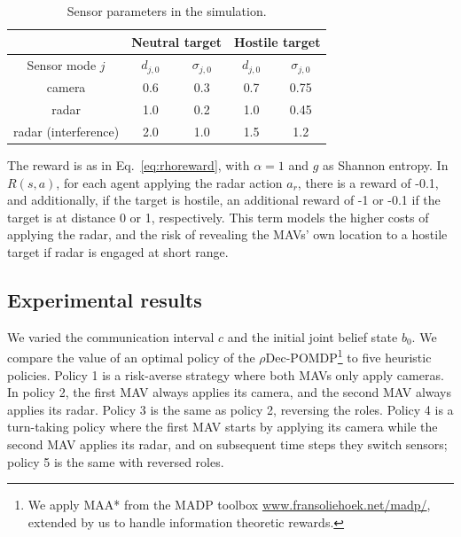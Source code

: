 \begin{table}[]
\centering
\caption{Sensor parameters in the simulation.}
\label{tab:obsmodel}
\begin{tabular}{@{}ccccc@{}}
\toprule
            & \multicolumn{2}{c}{Neutral target} & \multicolumn{2}{c}{Hostile target} \\ \midrule
Sensor mode $j$ & $d_{j,0}$      & $\sigma_{j,0}$  & $d_{j,0}$       & $\sigma_{j,0}$            \\ \midrule
camera              &   0.6      &  0.3            &   0.7           & 0.75             \\
radar               &  1.0       &  0.2            &   1.0           & 0.45             \\
radar (interference)&  2.0       &  1.0            &   1.5           & 1.2             \\ \bottomrule
\end{tabular}
\end{table}


The reward is as in Eq.~\eqref{eq:rhoreward}, with $\alpha = 1$ and $g$ as Shannon entropy.
In $R(s,a)$, for each agent applying the radar action $a_r$, there is a reward of -0.1, and additionally, if the target is hostile, an additional reward of -1 or -0.1 if the target is at distance 0 or 1, respectively.
This term models the higher costs of applying the radar, and the risk of revealing the MAVs' own location to a hostile target if radar is engaged at short range.

\subsection{Experimental results}
We varied the communication interval $c$ and the initial joint belief state $b_0$.
We compare the value of an optimal policy of the $\rho$Dec-POMDP\footnote{We apply MAA* from the MADP toolbox \url{www.fransoliehoek.net/madp/}, extended by us to handle information theoretic rewards.} to five heuristic policies.
Policy 1 is a risk-averse strategy where both MAVs only apply cameras.
In policy 2, the first MAV always applies its camera, and the second MAV always applies its radar.
Policy 3 is the same as policy 2, reversing the roles.
Policy 4 is a turn-taking policy where the first MAV starts by applying its camera while the second MAV applies its radar, and on subsequent time steps they switch sensors; policy 5 is the same with reversed roles.

